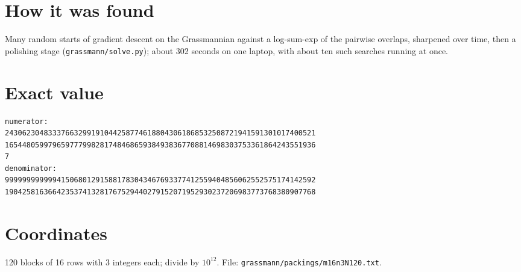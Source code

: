 \documentclass[11pt,a4paper]{article}
\begin{document}
\section{How it was found}
Many random starts of gradient descent on the Grassmannian against a log-sum-exp of the pairwise overlaps, sharpened over time, then a polishing stage (\texttt{grassmann/solve.py}); about 302 seconds on one laptop, with about ten such searches running at once.


\appendix
\section{Exact value}
{\small
\begin{verbatim}
numerator:
243062304833376632991910442587746188043061868532508721941591301017400521
165448059979659777998281748468659384938367708814698303753361864243551936
7
denominator:
999999999999415068012915881783043467693377412559404856062552575174142592
190425816366423537413281767529440279152071952930237206983773768380907768
\end{verbatim}}

\section{Coordinates}
120 blocks of 16 rows with 3 integers each; divide by $10^{12}$. File: \texttt{grassmann/packings/m16n3N120.txt}.
{\tiny
\begin{multicols}{3}
\end{multicols}}
\end{document}
